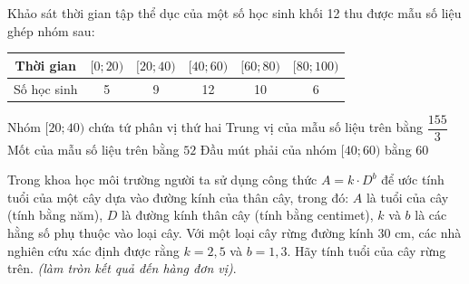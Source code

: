 \begin{ex}%
	Khảo sát thời gian tập thể dục của một số học sinh khối 12 thu được mẫu số liệu ghép nhóm sau:
	\begin{center}
		\begin{tabular}{|c|c|c|c|c|c|}
			\hline
			Thời gian & $[0;20)$ & $[20;40)$ & $[40;60)$ & $[60;80)$ & $[80;100)$ \\
			\hline
			Số học sinh & 5 & 9 & 12 & 10 & 6 \\
			\hline
		\end{tabular}
	\end{center}
	\choiceTF
	{Nhóm $[20;40)$ chứa tứ phân vị thứ hai}
	{\True Trung vị của mẫu số liệu trên bằng $\dfrac{155}{3}$}
	{\True Mốt của mẫu số liệu trên bằng $52$}
	{\True Đầu mút phải của nhóm $[40;60)$ bằng $60$}
	\loigiai{
		\begin{itemchoice}
			\itemch Ta có $n=5+9+12+10+6=42$ và $\dfrac{42+1}{2} = 21{,}5$ nên $Q_2\in [40;60)$.
			\itemch Trung vị là $Q_2=40+\dfrac{\frac{42}{2}-14}{12}\cdot 20 = \dfrac{155}{3}$.
			\itemch Vì $M_0 \in [40;60)$ nên $M_0 = 40 + \dfrac{12-9}{(12-9)+(12-10)}\cdot 20 = 52$.
			\itemch Đầu mút phải của nhóm $[40;60)$ bằng $60$.
		\end{itemchoice}
	}
\end{ex}

\begin{bt}%
	Trong khoa học môi trường người ta sử dụng công thức $A=k\cdot D^b$ để ước tính tuổi của một cây dựa vào đường kính của thân cây, trong đó: $A$ là tuổi của cây (tính bằng năm), $D$ là đường kính thân cây (tính bằng centimet), $k$ và $b$ là các hằng số phụ thuộc vào loại cây. Với một loại cây rừng đường kính $30$ cm, các nhà nghiên cứu xác định được rằng $k=2,5$ và $b=1,3$. Hãy tính tuổi của cây rừng trên. {\it (làm tròn kết quả đến hàng đơn vị)}.
\end{bt}

